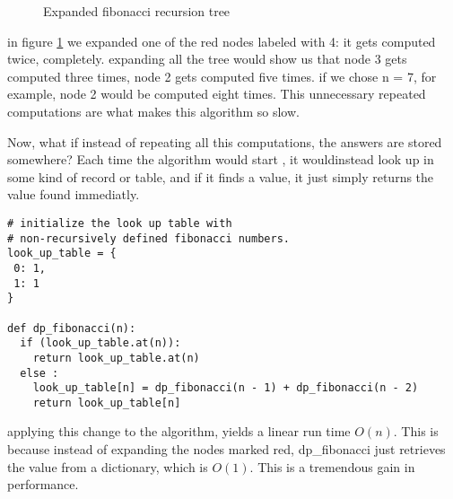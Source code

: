 \begin{figure}[ht]
  \centering
  \caption{Expanded fibonacci recursion tree}
  \label{fig:fib2}
\end{figure}

in figure \ref{fig:fib2} we expanded one of the red nodes labeled with 4: it gets computed twice, completely.
expanding all the tree would show us that node 3 gets computed three times, node 2 gets computed five times.
if we chose n = 7, for example, node 2 would be computed eight times. This unnecessary repeated
computations are  what makes this algorithm so slow.

Now, what if instead of repeating all this computations, the answers are stored somewhere? Each
time the algorithm would start , it wouldinstead look up in some kind of record or table, 
and if it finds a value, it just simply returns the value found immediatly.


\begin{verbatim}
# initialize the look up table with 
# non-recursively defined fibonacci numbers.
look_up_table = {
 0: 1,
 1: 1  
}

def dp_fibonacci(n):
  if (look_up_table.at(n)):
    return look_up_table.at(n)
  else :
    look_up_table[n] = dp_fibonacci(n - 1) + dp_fibonacci(n - 2)
    return look_up_table[n]
\end{verbatim}


applying this change to the algorithm, yields a linear run time $O(n)$. This is because instead of expanding the
nodes marked red, dp\_fibonacci just retrieves the value from a dictionary, which is $O(1)$. This
is a tremendous gain in performance.



